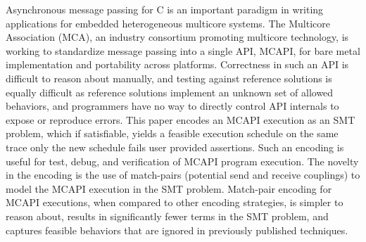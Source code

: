 Asynchronous message passing for C is an important paradigm in writing
applications for embedded heterogeneous multicore systems.  The
Multicore Association (MCA), an industry consortium promoting
multicore technology, is working to standardize message passing into a
single API, MCAPI, for bare metal implementation and portability
across platforms.  Correctness in such an API is difficult to reason
about manually, and testing against reference solutions is equally
difficult as reference solutions implement an unknown set of allowed
behaviors, and programmers have no way to directly control API
internals to expose or reproduce errors.  This paper encodes an MCAPI
execution as an SMT problem, which if satisfiable, yields a feasible
execution schedule on the same trace only the new schedule fails user
provided assertions.  Such an encoding is useful for test, debug, and
verification of MCAPI program execution.  The novelty in the encoding
is the use of match-pairs (potential send and receive couplings) to
model the MCAPI execution in the SMT problem.  Match-pair encoding for
MCAPI executions, when compared to other encoding strategies, is
simpler to reason about, results in significantly fewer terms in the
SMT problem, and captures feasible behaviors that are ignored in
previously published techniques.

